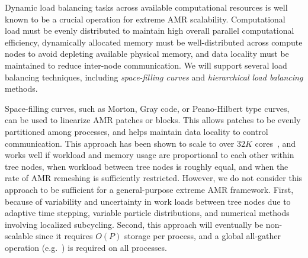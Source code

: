 \documentclass[11pt,letterpaper]{article}
\begin{document}
%
Dynamic load balancing tasks across available computational resources 
is well known to be a crucial
operation for extreme AMR scalability.
Computational load must be evenly distributed to maintain
high overall parallel computational efficiency, dynamically allocated
memory must be well-distributed across compute nodes to avoid
depleting available physical memory, and data locality must be
maintained to reduce inter-node communication.
We will support several load
balancing techniques, including \textit{space-filling curves} and
\textit{hierarchical load balancing} methods.

Space-filling curves, such as Morton, Gray code, or Peano-Hilbert type
curves, can be used to linearize AMR patches or blocks.  This allows
patches to be evenly partitioned among processes, and helps maintain
data locality to control communication.  This approach has been shown
to scale to over $32K$ cores~\cite{BuGh08}, and works well if workload
and memory usage are proportional to each other within tree nodes,
when workload between tree nodes is roughly equal, and when the
rate of AMR remeshing is sufficiently restricted.
However, we do not consider this approach to be sufficient for a
general-purpose extreme AMR framework.  First, because of variability
and uncertainty in work loads between tree nodes due to adaptive
time stepping, variable particle distributions, and numerical methods
involving localized subcycling.
%
%
%
%
Second, this approach will eventually be non-scalable since it
requires $O(P)$ storage per process, and a global all-gather
operation (e.g.~) is required on all processes.
\end{document}
